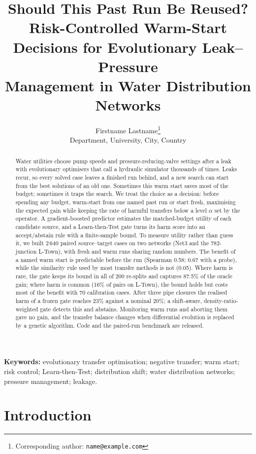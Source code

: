 \documentclass[11pt]{article}
\title{\textbf{Should This Past Run Be Reused?\\[2pt]
\large Risk-Controlled Warm-Start Decisions for Evolutionary Leak--Pressure\\ Management in Water Distribution Networks}}
\author{
  Firstname Lastname\thanks{Corresponding author: \texttt{name@example.com}}\\
  {\small Department, University, City, Country}
}
\date{}
\begin{document}
\maketitle

\begin{abstract}
\noindent
Water utilities choose pump speeds and pressure-reducing-valve settings after a leak with evolutionary optimisers
that call a hydraulic simulator thousands of times. Leaks recur, so every solved case leaves a finished run behind,
and a new search can start from the best solutions of an old one. Sometimes this warm start saves most of the
budget; sometimes it traps the search. We treat the choice as a decision: before spending any budget, warm-start
from one named past run or start fresh, maximising the expected gain while keeping the rate of harmful transfers
below a level $\alpha$ set by the operator. A gradient-boosted predictor estimates the matched-budget utility of each
candidate source, and a Learn-then-Test gate turns its harm score into an accept/abstain rule with a finite-sample
bound. To measure utility rather than guess it, we built 2\,640 paired source--target cases on two networks (Net3
and the 782-junction L-Town), with fresh and warm runs sharing random numbers. The benefit of a named warm start is
predictable before the run (Spearman 0.58; 0.67 with a probe), while the similarity rule used by most transfer
methods is not (0.05). Where harm is rare, the gate keeps its bound in all of 200 re-splits and captures 87.5\% of the
oracle gain; where harm is common (16\% of pairs on L-Town), the bound holds but costs most of the benefit with 70
calibration cases. After three pipe closures the realised harm of a frozen gate reaches 23\% against a nominal 20\%;
a shift-aware, density-ratio-weighted gate detects this and abstains. Monitoring warm runs and aborting them gave
no gain, and the transfer balance changes when differential evolution is replaced by a genetic algorithm. Code and
the paired-run benchmark are released.
\end{abstract}

\noindent\textbf{Keywords:} evolutionary transfer optimisation; negative transfer; warm start; risk control;
Learn-then-Test; distribution shift; water distribution networks; pressure management; leakage.

\section{Introduction}\label{sec:intro}
\end{document}
